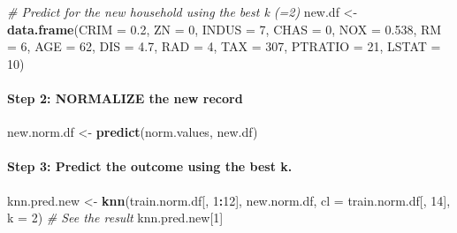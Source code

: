 \documentclass[]{article}
\newenvironment{Shaded}{\begin{snugshade}}{\end{snugshade}}
\newcommand{\KeywordTok}[1]{\textcolor[rgb]{0.13,0.29,0.53}{\textbf{#1}}}
\newcommand{\DataTypeTok}[1]{\textcolor[rgb]{0.13,0.29,0.53}{#1}}
\newcommand{\DecValTok}[1]{\textcolor[rgb]{0.00,0.00,0.81}{#1}}
\newcommand{\FloatTok}[1]{\textcolor[rgb]{0.00,0.00,0.81}{#1}}
\newcommand{\StringTok}[1]{\textcolor[rgb]{0.31,0.60,0.02}{#1}}
\newcommand{\CommentTok}[1]{\textcolor[rgb]{0.56,0.35,0.01}{\textit{#1}}}
\newcommand{\OperatorTok}[1]{\textcolor[rgb]{0.81,0.36,0.00}{\textbf{#1}}}
\newcommand{\NormalTok}[1]{#1}
\let\oldparagraph\paragraph
\renewcommand{\paragraph}[1]{\oldparagraph{#1}\mbox{}}
\begin{document}
\begin{Shaded}
\begin{Highlighting}[]
\CommentTok{# Predict for the new household using the best k (=2)}
\NormalTok{new.df <-}\StringTok{ }\KeywordTok{data.frame}\NormalTok{(}\DataTypeTok{CRIM =} \FloatTok{0.2}\NormalTok{, }\DataTypeTok{ZN =} \DecValTok{0}\NormalTok{, }\DataTypeTok{INDUS =} \DecValTok{7}\NormalTok{, }\DataTypeTok{CHAS =} \DecValTok{0}\NormalTok{, }\DataTypeTok{NOX =} \FloatTok{0.538}\NormalTok{, }\DataTypeTok{RM =} \DecValTok{6}\NormalTok{, }\DataTypeTok{AGE =} \DecValTok{62}\NormalTok{, }\DataTypeTok{DIS =} \FloatTok{4.7}\NormalTok{, }\DataTypeTok{RAD =} \DecValTok{4}\NormalTok{, }\DataTypeTok{TAX =} \DecValTok{307}\NormalTok{, }\DataTypeTok{PTRATIO =} \DecValTok{21}\NormalTok{, }\DataTypeTok{LSTAT =} \DecValTok{10}\NormalTok{)}
\end{Highlighting}
\end{Shaded}

\paragraph{Step 2: NORMALIZE the new
record}\label{step-2-normalize-the-new-record}

\begin{Shaded}
\begin{Highlighting}[]
\NormalTok{new.norm.df <-}\StringTok{ }\KeywordTok{predict}\NormalTok{(norm.values, new.df)}
\end{Highlighting}
\end{Shaded}

\paragraph{Step 3: Predict the outcome using the best
k.}\label{step-3-predict-the-outcome-using-the-best-k.}

\begin{Shaded}
\begin{Highlighting}[]
\NormalTok{knn.pred.new <-}\StringTok{ }\KeywordTok{knn}\NormalTok{(train.norm.df[, }\DecValTok{1}\OperatorTok{:}\DecValTok{12}\NormalTok{], new.norm.df, }
                    \DataTypeTok{cl =}\NormalTok{ train.norm.df[, }\DecValTok{14}\NormalTok{], }\DataTypeTok{k =} \DecValTok{2}\NormalTok{)}
\CommentTok{# See the result}
\NormalTok{knn.pred.new[}\DecValTok{1}\NormalTok{]}
\end{Highlighting}
\end{Shaded}
\end{document}
